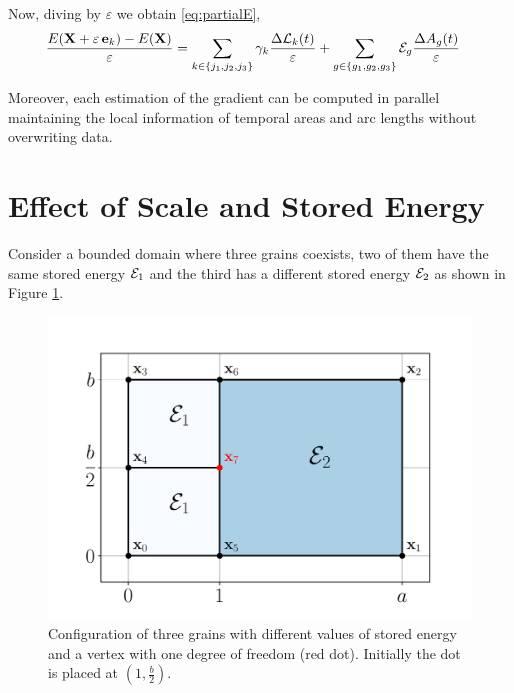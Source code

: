 Now, diving by $\varepsilon$ we obtain \eqref{eq:partialE},
\begin{align*}
    \dfrac{E(\X+\varepsilon\,  \ei{k}) - E(\X)}{\varepsilon} &=  
    \sum_{k \in \{j_1,j_2,j_3\}}\gamma_{k}\dfrac{\Delta{\AL}_{k}(t)}{\varepsilon}
     +\sum_{g \in \{g_1,g_2,g_3\}} \SE_{g}\dfrac{\Delta{A}_{g}(t)}{\varepsilon}
\end{align*}

Moreover, each estimation of the gradient can be computed in parallel maintaining the local information of temporal areas and arc lengths without overwriting data.

\section{Effect of Scale and Stored Energy}
Consider a bounded domain where three grains coexists, two of them have the same stored energy $\mathcal{E}_1$ and the third has a different stored energy $\mathcal{E}_2$ as shown in Figure \ref{fig:segrains}. 

\begin{figure}
    \centering
    \includegraphics[scale=0.5]{figures/SE_analysis.pdf}
    \caption[Configuration of three grains with different values of stored energy and a vertex with one degree of freedom]{Configuration of three grains with different values of stored energy and a vertex with one degree of freedom (red dot). Initially the dot is placed at $(1,\frac{b}{2})$.}
    \label{fig:segrains}
\end{figure}

